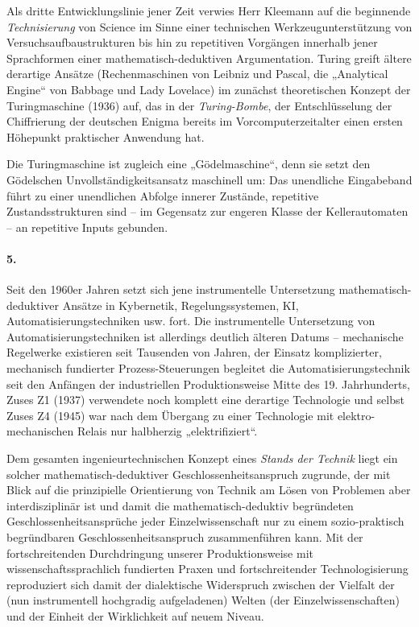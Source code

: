 \documentclass[11pt,a4paper]{article}
\begin{document}
Als dritte Entwicklungslinie jener Zeit verwies Herr Kleemann auf die
beginnende \emph{Technisierung} von Science im Sinne einer technischen
Werkzeugunterstützung von Versuchsaufbaustrukturen bis hin zu repetitiven
Vorgängen innerhalb jener Sprachformen einer mathe\-matisch-deduktiven
Argumentation. Turing greift ältere derartige Ansätze (Rechenmaschinen von
Leibniz und Pascal, die „Analytical Engine“ von Babbage und Lady Lovelace) im
zunächst theoretischen Konzept der Turingmaschine (1936) auf, das in der
\emph{Turing-Bombe}, der Entschlüsselung der Chiffrierung der deutschen Enigma
bereits im Vorcomputerzeitalter einen ersten Höhepunkt praktischer Anwendung
hat.

Die Turingmaschine ist zugleich eine „Gödelmaschine“, denn sie setzt den
Gödelschen Unvollständigkeitsansatz maschinell um: Das unendliche Eingabeband
führt zu einer unendlichen Abfolge innerer Zustände, repetitive
Zustandsstrukturen sind -- im Gegensatz zur engeren Klasse der Kellerautomaten
-- an repetitive Inputs gebunden.

\paragraph{5.}
Seit den 1960er Jahren setzt sich jene instrumentelle Untersetzung
mathematisch-deduk\-tiver Ansätze in Kybernetik, Regelungssystemen, KI,
Automatisierungstechniken usw. fort. Die instrumentelle Untersetzung von
Automatisierungstechniken ist allerdings deutlich älteren Datums --
mechanische Regelwerke existieren seit Tausenden von Jahren, der Einsatz
komplizierter, mechanisch fundierter Prozess-Steuerungen begleitet die
Automatisierungstechnik seit den Anfängen der industriellen Produktionsweise
Mitte des 19. Jahrhunderts, Zuses Z1 (1937) verwendete noch komplett eine
derartige Technologie und selbst Zuses Z4 (1945) war nach dem Übergang zu
einer Technologie mit elektro-mechanischen Relais nur halbherzig
„elektrifiziert“.

Dem gesamten ingenieurtechnischen Konzept eines \emph{Stands der Technik}
liegt ein solcher mathe\-matisch-deduktiver Geschlossenheitsanspruch zugrunde,
der mit Blick auf die prinzipielle Orientierung von Technik am Lösen von
Problemen aber interdisziplinär ist und damit die mathematisch-deduktiv
begründeten Geschlossenheitsansprüche jeder Einzelwissenschaft nur zu einem
sozio-praktisch begründbaren Geschlossenheitsanspruch zusammenführen kann. Mit
der fortschreitenden Durchdringung unserer Produktionsweise mit
wissenschaftssprachlich fundierten Praxen und fortschreitender
Technologisierung reproduziert sich damit der dialektische Widerspruch
zwischen der Vielfalt der (nun instrumentell hochgradig aufgeladenen) Welten
(der Einzelwissenschaften) und der Einheit der Wirklichkeit auf neuem Niveau.
\end{document}
